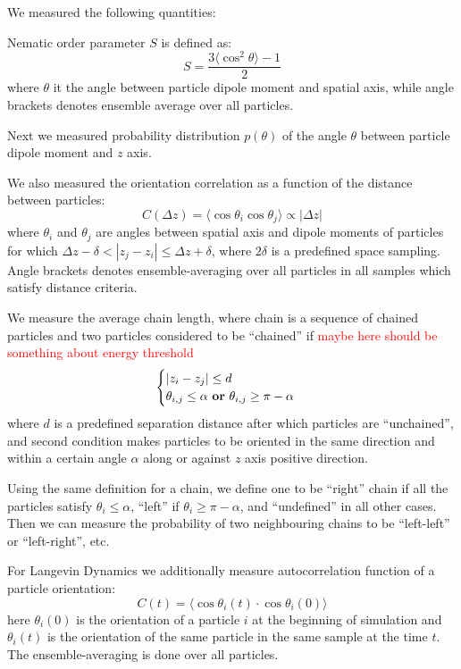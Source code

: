 We measured the following quantities:

Nematic order parameter $S$ is defined as:
\begin{equation}
\label{eq:nematic_order_parameter}
	S = \frac{3 \langle\cos^2 \theta\rangle - 1}{2}
\end{equation}
where $\theta$ it the angle between particle dipole moment and spatial axis, while angle brackets denotes ensemble average over all particles.

Next we measured probability distribution $p(\theta)$ of the angle $\theta$ between particle dipole moment and $z$ axis.

We also measured the orientation correlation as a function of the distance between particles:
\begin{equation}
\label{eq:distance_correlation}
	C(\Delta z) = \langle\cos \theta_i \cos \theta_j\rangle \propto |\Delta z|
\end{equation}
where $\theta_i$ and $\theta_j$ are angles between spatial axis and dipole moments of particles for which $\Delta z - \delta < |z_j - z_i| \leq \Delta z + \delta$, where $2\delta$ is a predefined space sampling. Angle brackets denotes ensemble-averaging over all particles in all samples which satisfy distance criteria.

We measure the average chain length, where chain is a sequence of chained particles and two particles considered to be ``chained'' if 
\textcolor{red}{maybe here should be something about energy threshold}
\begin{equation}
\label{eq:chains_definition}
\begin{cases}
	|z_i - z_j| \leq d \\
	\theta_{i, j} \leq \alpha \text{ \textbf{or} } \theta_{i, j} \geq \pi - \alpha
\end{cases}
\end{equation}
where $d$ is a predefined separation distance after which particles are ``unchained'', and second condition makes particles to be oriented in the same direction and within a certain angle $\alpha$ along or against $z$ axis positive direction.

Using the same definition for a chain, we define one to be ``right'' chain if all the particles satisfy $\theta_i \leq \alpha$, ``left'' if $\theta_i \geq \pi - \alpha$, and ``undefined'' in all other cases. Then we can measure the probability of two neighbouring chains to be ``left-left'' or ``left-right'', etc.

For Langevin Dynamics we additionally measure autocorrelation function of a particle orientation:
\begin{equation}
\label{eq:autocorrelation_ld}
	C(t) = \langle\cos\theta_i(t) \cdot \cos\theta_i(0)\rangle
\end{equation}
here $\theta_i(0)$ is the orientation of a particle $i$ at the beginning of simulation and $\theta_i(t)$ is the orientation of the same particle in the same sample at the time $t$. The ensemble-averaging is done over all particles.
